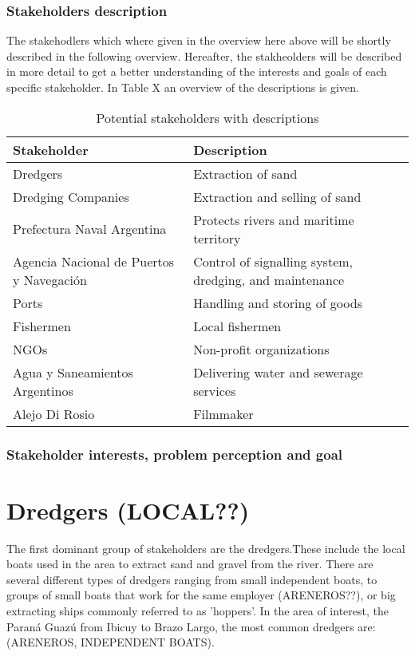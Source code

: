 \subsubsection{Stakeholders description}

The stakehodlers which where given in the overview here above will be shortly described in the following overview. Hereafter, the stakheolders will be described in more detail to get a better understanding of the interests and goals of each specific stakeholder. In Table X an overview of the descriptions is given.

\begin{table}[ht]
\centering
\begin{tabularx}{\linewidth}{lX}
\toprule
\textbf{Stakeholder} & \textbf{Description} \\
\midrule
Dredgers & Extraction of sand \\
\midrule
Dredging Companies & Extraction and selling of sand \\
\midrule
Prefectura Naval Argentina & Protects rivers and maritime territory \\
\midrule
Agencia Nacional de Puertos y Navegación & Control of signalling system, dredging, and maintenance \\
\midrule
Ports & Handling and storing of goods \\
\midrule
Fishermen & Local fishermen \\
\midrule
NGOs & Non-profit organizations \\
\midrule
Agua y Saneamientos Argentinos & Delivering water and sewerage services \\
\midrule
Alejo Di Rosio & Filmmaker \\
\bottomrule
\end{tabularx}
\caption{Potential stakeholders with descriptions}
\label{tab:stakeholders-description}
\end{table}




\subsubsection{Stakeholder interests, problem perception and goal}



\section{Dredgers (LOCAL??)}
The first dominant group of stakeholders are the dredgers.These include the local boats used in the area to extract sand and gravel from the river. There are several different types of dredgers ranging from small independent boats, to groups of small boats that work for the same employer (ARENEROS??), or big extracting ships commonly referred to as 'hoppers'. In the area of interest, the Paraná Guazú from Ibicuy to Brazo Largo, the most common dredgers are: (ARENEROS, INDEPENDENT BOATS). 

